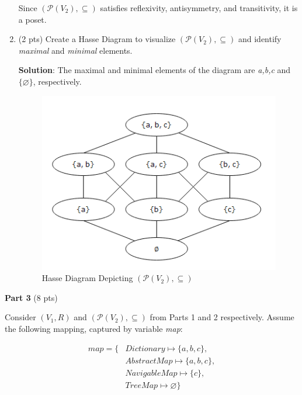 \documentclass[12pt]{article}
\begin{document}
\begin{spacing}{1.5}
\begin{enumerate}
		      Since \( (\mathcal{P}(V_2),\subseteq) \) satisfies reflexivity, antisymmetry, and transitivity, it is a poset.
		      		              
		\item (2 pts) Create a Hasse Diagram to visualize $(\mathcal{P}(V_2),\subseteq)$ and identify \textit{maximal} and \textit{minimal} elements.

            \textbf{Solution}: The maximal and minimal elements of the diagram are \textit{a,b,c} and $\{\varnothing\}$, respectively.
            
		      \begin{figure}[htp]
		      	\centering
		      	\includegraphics{static/HasseDiagram_6_2_3.png}
		      	\caption{Hasse Diagram Depicting $(\mathcal{P}(V_2),\subseteq)$}
		      	\label{fig:figure}
		      \end{figure}
		      		        
	\end{enumerate}

    \newpage
    
	\noindent \textbf{Part 3} (8 pts)
			
	\noindent Consider $(V_1, R)$ and $(\mathcal{P}(V_2), \subseteq)$ from Parts 1 and 2 respectively. Assume the following mapping, captured by variable \textit{map}:
			
	\begin{align*}
		map = \{ & Dictionary \mapsto \{a,b,c\},  \\
		         & AbstractMap \mapsto \{a,b,c\}, \\
		         & NavigableMap \mapsto \{c\},    \\
		         & TreeMap \mapsto \varnothing\}  
	\end{align*}
			

\end{spacing}
\end{document}
